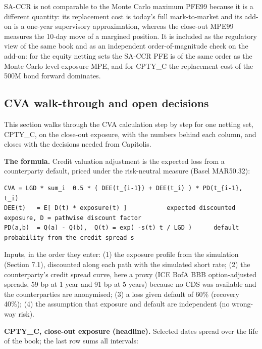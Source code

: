 \documentclass[11pt,letterpaper]{article}
\begin{document}
{\small SA-CCR is not comparable to the Monte Carlo maximum PFE99 because it is a different quantity: its replacement cost is today's full mark-to-market and its add-on is a one-year supervisory approximation, whereas the close-out MPE99 measures the 10-day move of a margined position. It is included as the regulatory view of the same book and as an independent order-of-magnitude check on the add-on: for the equity netting sets the SA-CCR PFE is of the same order as the Monte Carlo level-exposure MPE, and for CPTY\_C the replacement cost of the 500M bond forward dominates.}

\subsection{CVA walk-through and open decisions}
This section walks through the CVA calculation step by step for one netting set, CPTY\_C, on the close-out exposure, with the numbers behind each column, and closes with the decisions needed from Capitolis.

\textbf{The formula.} Credit valuation adjustment is the expected loss from a counterparty default, priced under the risk-neutral measure (Basel MAR50.32):

{\fontsize{7.2}{8.8}\selectfont
\begin{verbatim}
CVA = LGD * sum_i  0.5 * ( DEE(t_{i-1}) + DEE(t_i) ) * PD(t_{i-1}, t_i)
DEE(t)   = E[ D(t) * exposure(t) ]           expected discounted exposure, D = pathwise discount factor
PD(a,b)  = Q(a) - Q(b),  Q(t) = exp( -s(t) t / LGD )      default probability from the credit spread s
\end{verbatim}}
Inputs, in the order they enter: (1) the exposure profile from the simulation (Section 7.1), discounted along each path with the simulated short rate; (2) the counterparty's credit spread curve, here a proxy (ICE BofA BBB option-adjusted spreads, 59 bp at 1 year and 91 bp at 5 years) because no CDS was available and the counterparties are anonymised; (3) a loss given default of 60\% (recovery 40\%); (4) the assumption that exposure and default are independent (no wrong-way risk).

\textbf{CPTY\_C, close-out exposure (headline).} Selected dates spread over the life of the book; the last row sums all intervals:
\end{document}
